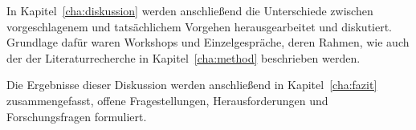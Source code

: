 In Kapitel~\ref{cha:diskussion} werden anschließend die Unterschiede zwischen
vorgeschlagenem und tatsächlichem Vorgehen herausgearbeitet und diskutiert. Grundlage dafür waren Workshops und Einzelgespräche, deren Rahmen, wie auch der der Literaturrecherche in Kapitel~\ref{cha:method} beschrieben werden.

Die Ergebnisse dieser Diskussion werden anschließend in Kapitel~\ref{cha:fazit}
zusammengefasst, offene Fragestellungen, Herausforderungen und Forschungsfragen
formuliert.
\begin{comment}


Lösungen
haben ganz allgemein zwei Vorteile für Unternehmen, die am für Salesforce
typischen Beispiel einer Kundenverwaltung schildern möchte. Möchte ein
Unternehmen Informationen zu seinen Kunden zentral speichern, muss es bei einer
Cloudlösung keinen Server installieren und warten. Es kann also Kosten für
Hardware sowie mindestens noch Personalkosten bei der Administration einsparen.
Der erste Vorteil entsteht also durch Kosteneinsparungen auf Serverseite des
Unternehmens. Cloudbasierte Software lässt sich regelmäßig mit einem Browser
bedienen, der auf allen mobilen und internetfähigen Geräten wie auf
herkömmlichen Computern verfügbar sein dürfte. Im Beispiel muss der Anwender,
der Zugriff auf die Kundendaten nehmen will, keine Software installieren und
ist an kein Gerät gebunden.\\
Die Idee hinter dem Migrationsprojekt ist die Verbindung der Expertise beider
Unternehmen: Die Nutzung des aufgebauten Know-Hows auf einer neuen,
zukunftsfähigen Plattform. \\
Dabei stellen sich die folgenden Fragen:
\begin{itemize}
	\item Welche Strategie sollte künftig mit dem bestehenden Produkt
verfolgt werden?
	\item In welchem Umfang soll die Cloud Software durch
	\begin{itemize}
		\item den Anbieter
		\item den Kunden
	\end{itemize}
	anpassbar sein?
	\item Wie lassen sich idealerweise die Anforderungen ermitteln?
	\item Welche Funktionen sollen übernommen werden?
	\item Wie lässt sich ein bestehendes Produkt an die neuen Möglichkeiten
der Cloud anpassen?
\end{itemize}

Im folgenden gebe ich einen Überblick über Methoden des
Requirements-Engineering.
\end{comment}
